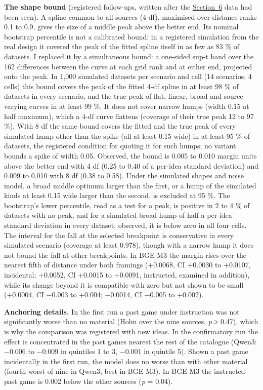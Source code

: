\documentclass[
  10pt,
]{article}
\begin{document}
\textbf{The shape bound} (registered
follow-ups, written after the
\hyperref[sec:6]{Section~6} data had
been seen). A spline common to all
sources (4 df), maximised over distance
ranks 0.1 to 0.9, gives the size of a
middle peak above the better end. Its
nominal bootstrap percentile is not a
calibrated bound: in a registered
simulation from the real design it
covered the peak of the fitted spline
itself in as few as 83 \% of datasets. I
replaced it by a simultaneous bound: a
one-sided sup-t band over the 162
differences between the curve at each
grid rank and at either end, projected
onto the peak. In 1,000 simulated
datasets per scenario and cell (14
scenarios, 4 cells) this bound covers
the peak of the fitted 4-df spline in at
least 98 \% of datasets in every
scenario, and the true peak of flat,
linear, broad and source-varying curves
in at least 99 \%. It does not cover
narrow humps (width 0.15 at half
maximum), which a 4-df curve flattens
(coverage of their true peak 12 to 97
\%). With 8 df the same bound covers the
fitted and the true peak of every
simulated hump other than the spike (all
at least 0.15 wide) in at least 95 \% of
datasets, the registered condition for
quoting it for such humps; no variant
bounds a spike of width 0.05. Observed,
the bound is 0.005 to 0.010 margin units
above the better end with 4 df (0.25 to
0.40 of a per-idea standard deviation)
and 0.009 to 0.010 with 8 df (0.38 to
0.58). Under the simulated shapes and
noise model, a broad middle optimum
larger than the first, or a hump of the
simulated kinds at least 0.15 wide
larger than the second, is excluded at
95 \%. The bootstrap's lower percentile,
read as a test for a peak, is positive
in 2 to 4 \% of datasets with no peak,
and for a simulated broad hump of half a
per-idea standard deviation in every
dataset; observed, it is below zero in
all four cells. The interval for the
fall at the selected breakpoint is
conservative in every simulated scenario
(coverage at least 0.978), though with a
narrow hump it does not bound the fall
at other breakpoints. In BGE-M3 the
margin rises over the nearest fifth of
distance under both framings (+0.0068,
CI +0.0030 to +0.0107, incidental;
+0.0052, CI +0.0015 to +0.0091,
instructed, examined in addition), while
its change beyond it is compatible with
zero but not shown to be small (+0.0004,
CI −0.003 to +0.004; −0.0014, CI −0.005
to +0.002).

\textbf{Anchoring details.} In the first
run a past game under instruction was
not significantly worse than no material
(Holm over the nine sources, \emph{p} ≥
0.47), which is why the comparison was
registered with new ideas. In the
confirmatory run the effect is
concentrated in the past games nearest
the rest of the catalogue (Qwen3: −0.006
to −0.009 in quintiles 1 to 3, −0.001 in
quintile 5). Shown a past game
incidentally in the first run, the model
does no worse than with other material
(fourth worst of nine in Qwen3, best in
BGE-M3). In BGE-M3 the instructed past
game is 0.002 below the other sources
(\emph{p} = 0.04).
\end{document}
